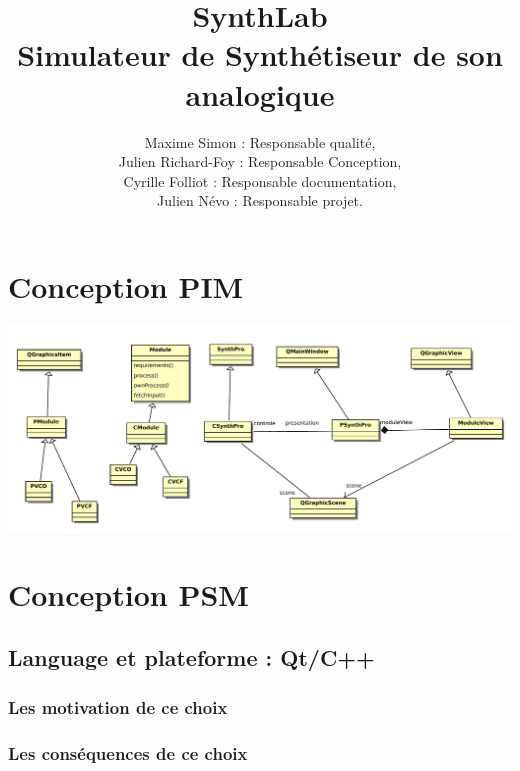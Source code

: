 \documentclass[a4paper,oneside,frenchb,12pt]{article}
\title{SynthLab\\Simulateur de Synthétiseur de son analogique}
\author{Maxime Simon : Responsable qualité,\\ Julien Richard-Foy : Responsable Conception,\\ Cyrille Folliot : Responsable documentation,\\Julien Névo : Responsable projet.}
\begin{document}
\maketitle
\section{Conception PIM}
\includegraphics[width=18cm]{../img/pac.pdf}

\section{Conception PSM}
\subsection{Language et plateforme : Qt/C++}
\subsubsection{Les motivation de ce choix}
\subsubsection{Les conséquences de ce choix}
\end{document}

